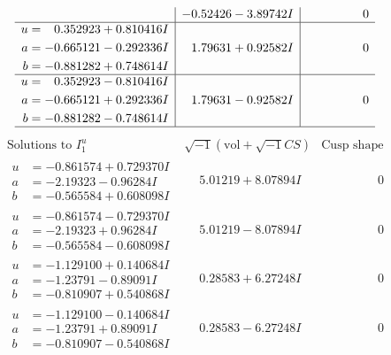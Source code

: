 \documentclass[1p]{elsarticle_modified}
\theoremstyle{definition}
\newcommand{\I}{\sqrt{-1}}
\begin{document}
$$\begin{array}{c|c|c}
 & -0.52426 - 3.89742 I & \phantom{-0.000000 } 0 \\ \hline\begin{aligned}
u &= \phantom{-}0.352923 + 0.810416 I \\
a &= -0.665121 - 0.292336 I \\
b &= -0.881282 + 0.748614 I\end{aligned}
 & \phantom{-}1.79631 + 0.92582 I & \phantom{-0.000000 } 0 \\ \hline\begin{aligned}
u &= \phantom{-}0.352923 - 0.810416 I \\
a &= -0.665121 + 0.292336 I \\
b &= -0.881282 - 0.748614 I\end{aligned}
 & \phantom{-}1.79631 - 0.92582 I & \phantom{-0.000000 } 0\\
 \hline 
 \end{array}$$\newpage$$\begin{array}{c|c|c}  
\text{Solutions to }I^u_{1}& \I (\text{vol} + \sqrt{-1}CS) & \text{Cusp shape}\\
 \hline 
\begin{aligned}
u &= -0.861574 + 0.729370 I \\
a &= -2.19323 - 0.96284 I \\
b &= -0.565584 + 0.608098 I\end{aligned}
 & \phantom{-}5.01219 + 8.07894 I & \phantom{-0.000000 } 0 \\ \hline\begin{aligned}
u &= -0.861574 - 0.729370 I \\
a &= -2.19323 + 0.96284 I \\
b &= -0.565584 - 0.608098 I\end{aligned}
 & \phantom{-}5.01219 - 8.07894 I & \phantom{-0.000000 } 0 \\ \hline\begin{aligned}
u &= -1.129100 + 0.140684 I \\
a &= -1.23791 - 0.89091 I \\
b &= -0.810907 + 0.540868 I\end{aligned}
 & \phantom{-}0.28583 + 6.27248 I & \phantom{-0.000000 } 0 \\ \hline\begin{aligned}
u &= -1.129100 - 0.140684 I \\
a &= -1.23791 + 0.89091 I \\
b &= -0.810907 - 0.540868 I\end{aligned}
 & \phantom{-}0.28583 - 6.27248 I & \phantom{-0.000000 } 0 \\ \hline\begin{aligned}

\end{aligned}
\end{array}$$
\end{document}
